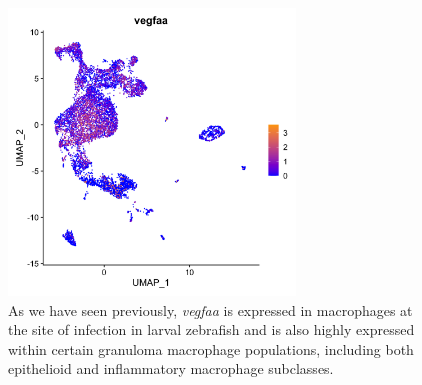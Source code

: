 \begin{figure}
\centering
\includegraphics[height=3in]{images/wtCombo_vegfaa_GEPlot.png}
\caption[scRNA-seq expression data for \textit{vegfaa}]{As we have seen previously, \textit{vegfaa} is expressed in macrophages at the site of infection in larval zebrafish and is also highly expressed within certain granuloma macrophage populations, including both epithelioid and inflammatory macrophage subclasses.}
\label{figure:scvegfaa}
\end{figure}

